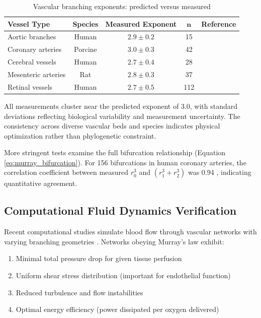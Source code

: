 \documentclass[12pt,a4paper]{article}
\theoremstyle{remark}
\begin{document}
\begin{table}[h]
\centering
\caption{Vascular branching exponents: predicted versus measured}
\label{tab:murray_validation}
\begin{tabular}{lcccc}
\toprule
\textbf{Vessel Type} & \textbf{Species} & \textbf{Measured Exponent} & \textbf{$\boldsymbol{n}$} & \textbf{Reference} \\
\midrule
Aortic branches & Human & $2.9 \pm 0.2$ & 15 & \cite{zamir1976optimality} \\
Coronary arteries & Porcine & $3.0 \pm 0.3$ & 42 & \cite{kassab1997scaling} \\
Cerebral vessels & Human & $2.7 \pm 0.4$ & 28 & \cite{rossitti1995optimal} \\
Mesenteric arteries & Rat & $2.8 \pm 0.3$ & 37 & \cite{suwa1963estimation} \\
Retinal vessels & Human & $2.7 \pm 0.5$ & 112 & \cite{chapman1996blood} \\
\bottomrule
\end{tabular}
\end{table}

All measurements cluster near the predicted exponent of 3.0, with standard deviations reflecting biological variability and measurement uncertainty. The consistency across diverse vascular beds and species indicates physical optimization rather than phylogenetic constraint.

More stringent tests examine the full bifurcation relationship (Equation \ref{eq:murray_bifurcation}). For 156 bifurcations in human coronary arteries, the correlation coefficient between measured $r_{0}^{3}$ and $(r_{1}^{3} + r_{2}^{3})$ was 0.94 \cite{kassab1997scaling}, indicating quantitative agreement.

\subsection{Computational Fluid Dynamics Verification}

Recent computational studies simulate blood flow through vascular networks with varying branching geometries \cite{huo2008intraspecific}. Networks obeying Murray's law exhibit:

\begin{enumerate}
\item Minimal total pressure drop for given tissue perfusion
\item Uniform shear stress distribution (important for endothelial function)
\item Reduced turbulence and flow instabilities
\item Optimal energy efficiency (power dissipated per oxygen delivered)
\end{enumerate}
\end{document}
